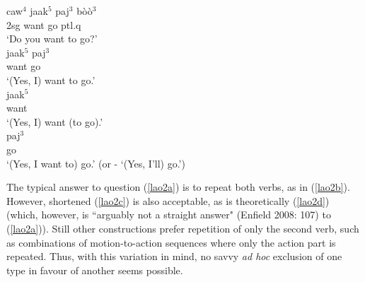 \pex \label{lao2}
\a \label{lao2a}
\gll caw$^4$ jaak$^5$ paj$^3$ bòò$^3$ \\
\acs{2}\acs{sg} want go \acs{ptl}.\acs{q} \\
\glft `Do you want to go?' \\ 
\z
\a \label{lao2b}
\gla jaak$^5$ paj$^3$ \\
want go \\
\glft `(Yes, I) want to go.' \\ 
\z
\a \label{lao2c}
\gla jaak$^5$ \\
want \\
\glft `(Yes, I) want (to go).' \\ 
\z
\a \label{lao2d}
\gla paj$^3$ \\ 
go \\
\glft `(Yes, I want to) go.' (or - `(Yes, I'll) go.') \\ 
\z
\xe

The typical answer to question (\ref{lao2a}) is to repeat both verbs, as in (\ref{lao2b}). However, shortened (\ref{lao2c}) is also acceptable, as is theoretically (\ref{lao2d}) (which, however, is ``arguably not a straight answer" (Enfield 2008: 107) to (\ref{lao2a})). Still other constructions prefer  repetition of only the second verb, such as combinations of motion-to-action sequences where only the action part is repeated. Thus, with this variation in mind, no savvy \textit{ad hoc} exclusion of one type in favour of another seems possible.

